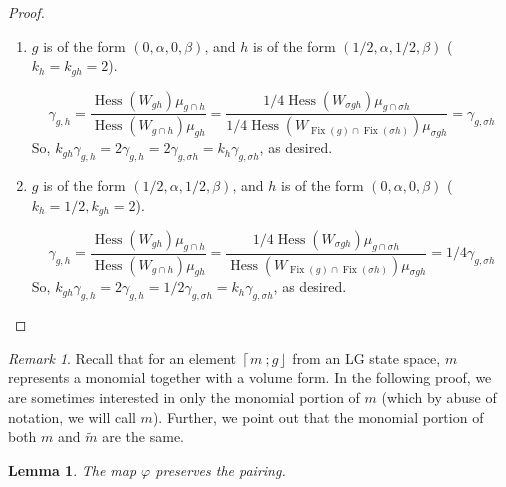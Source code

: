 \documentclass[10pt, letterpaper]{amsart}
\newtheorem{lem}[thm]{Lemma}
\theoremstyle{remark}
\newtheorem{rem}{Remark}[thm]
\newcommand{\fjrw}[2]{ \left\lceil #1 \:; #2 \right\rfloor }
\DeclareMathOperator{\Hess}{Hess}
\DeclareMathOperator{\Fix}{Fix}
\begin{document}
\begin{proof}
\begin{enumerate}
\item $g$ is of the form $(0, \alpha, 0, \beta)$, and $h$ is of the form $(1/2, \alpha, 1/2, \beta)$ ($k_h = k_{gh}= 2$).

\[
\gamma_{g,h}  =
\frac{\Hess (W_{gh})\mu_{g \cap h}}{\Hess (W_{g\cap h})\mu_{gh}} 
=\frac{1/4 \Hess (W_{\sigma gh})\mu_{ g \cap \sigma h}}{1/4 \Hess (W_{\Fix( g)\cap \Fix(\sigma h)})\mu_{\sigma gh}} 
=  \gamma_{g,\sigma h}
\]
So, 
$k_{gh}\gamma_{g,h} = 2 \gamma_{g,h} = 2\gamma_{g,\sigma h} = k_{h}\gamma_{g,\sigma h}$, as desired. 

\item $g$ is of the form $(1/2, \alpha, 1/2, \beta)$, and $h$ is of the form $(0, \alpha, 0, \beta)$ ($k_h= 1/2,  k_{gh}= 2$).

\[
\gamma_{g,h}  =
\frac{\Hess (W_{gh})\mu_{g \cap h}}{\Hess (W_{g\cap h})\mu_{gh}} 
=\frac{1/4\Hess (W_{\sigma gh})\mu_{ g \cap \sigma h}}{\Hess (W_{\Fix( g)\cap \Fix(\sigma h)})\mu_{\sigma gh}} 
=  1/4\gamma_{g,\sigma h}
\]
So, 
$k_{gh}\gamma_{g,h} = 2 \gamma_{g,h} = 1/2\gamma_{g,\sigma h} = k_{h}\gamma_{g,\sigma h}$, as desired. 
\fi
\end{enumerate}
 
\end{proof}

\begin{rem}
Recall that for an element $\fjrw{m}{g}$ from an LG state space, $m$ represents a monomial together with a volume form.  In the following proof, we are sometimes interested in only the monomial portion of $m$ (which by abuse of notation, we will call $m$).  Further, we point out that the monomial portion of both $m$ and $\tilde{m}$ are the same. 
\end{rem}

\begin{lem}The map $\varphi$ preserves the pairing. 
\end{lem}
\end{document}
